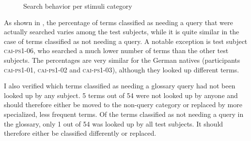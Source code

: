 \documentclass[output=paper]{langsci/langscibook}
\begin{document}
\begin{figure}
\caption{Search behavior per stimuli category\label{fig:prandi:9}}
\end{figure}

As shown in , the percentage of terms classified as needing a query that were actually searched varies among the test subjects, while it is quite similar in the case of terms classified as not needing a query. A notable exception is test subject \textsc{cai}-\textsc{ps1-06}, who searched a much lower number of terms than the other test subjects. The percentages are very similar for the German natives (participants \textsc{cai}-\textsc{ps1-01}, \textsc{cai}-\textsc{ps1-02} and \textsc{cai-ps1-03}), although they looked up different terms.

I also verified which terms classified as needing a glossary query had not been looked up by any subject. 5 terms out of 54 were not looked up by anyone and should therefore either be moved to the non-query category or replaced by more specialized, less frequent terms. Of the terms classified as not needing a query in the glossary, only 1 out of 54 was looked up by all test subjects. It should therefore either be classified differently or replaced. 
\end{document}
